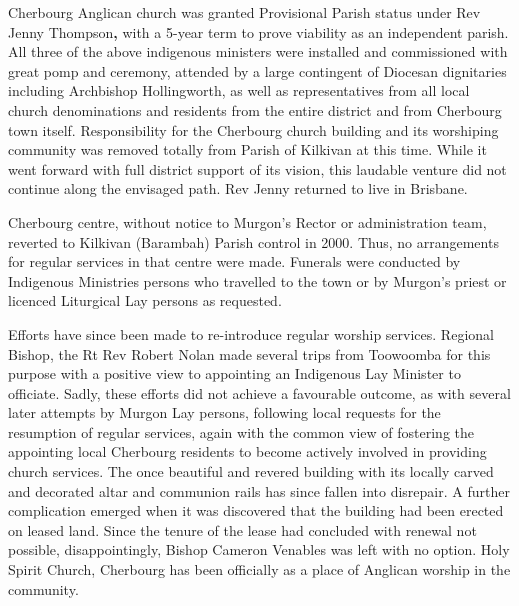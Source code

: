Cherbourg Anglican church was granted Provisional Parish status under Rev Jenny Thompson\textbf{,} with a 5-year term to prove viability as an independent parish. All three of the above indigenous ministers were installed and commissioned with great pomp and ceremony, attended by a large contingent of Diocesan dignitaries including Archbishop Hollingworth, as well as representatives from all local church denominations and residents from the entire district and from Cherbourg town itself. Responsibility for the Cherbourg church building and its worshiping community was removed totally from Parish of Kilkivan at this time. While it went forward with full district support of its vision, this laudable venture did not continue along the envisaged path. Rev Jenny returned to live in Brisbane.



Cherbourg centre, without notice to Murgon's Rector or administration team, reverted to Kilkivan (Barambah) Parish control in 2000. Thus, no arrangements for regular services in that centre were made. Funerals were conducted by Indigenous Ministries persons who travelled to the town or by Murgon's priest or licenced Liturgical Lay persons as requested.



Efforts have since been made to re-introduce regular worship services. Regional Bishop, the Rt Rev Robert Nolan made several trips from Toowoomba for this purpose with a positive view to appointing an Indigenous Lay Minister to officiate. Sadly, these efforts did not achieve a favourable outcome, as with several later attempts by Murgon Lay persons, following local requests for the resumption of regular services, again with the common view of fostering the appointing local Cherbourg residents to become actively involved in providing church services. The once beautiful and revered building with its locally carved and decorated altar and communion rails has since fallen into disrepair. A further complication emerged when it was discovered that the building had been erected on leased land. Since the tenure of the lease had concluded with renewal not possible, disappointingly, Bishop Cameron Venables was left with no option. Holy Spirit Church, Cherbourg has been officially as a place of Anglican worship in the community.




